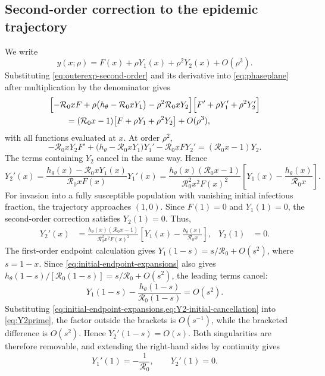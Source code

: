 \documentclass[11pt]{article}
\newcommand{\Rzero}{\mathcal R_0}
\newcommand{\rhoeps}{\rho}
\newcommand{\hth}{h_\theta}
\begin{document}
\subsection{Second-order correction to the epidemic trajectory}
We write
\begin{equation}
y(x;\rhoeps)=F(x)+\rhoeps Y_1(x)+\rhoeps^2Y_2(x)+O(\rhoeps^3).
\label{eq:outerexp-second-order}
\end{equation}
Substituting \cref{eq:outerexp-second-order} and its derivative into \cref{eq:phaseplane} after multiplication by the denominator gives
\[
\begin{aligned}
&\Bigl[-\Rzero xF+\rhoeps\bigl(\hth-\Rzero xY_1\bigr)
-\rhoeps^2\Rzero xY_2\Bigr]
\Bigl[F'+\rhoeps Y_1'+\rhoeps^2Y_2'\Bigr]\\
&\qquad=(\Rzero x-1)\bigl[F+\rhoeps Y_1+\rhoeps^2Y_2\bigr]+O(\rhoeps^3),
\end{aligned}
\]
with all functions evaluated at \(x\).
At order \(\rhoeps^2\),
\[
-\Rzero xY_2F'+\bigl(\hth-\Rzero xY_1\bigr)Y_1'
-\Rzero xF Y_2'=(\Rzero x-1)Y_2.
\]
The terms containing \(Y_2\) cancel in the same way. Hence
\[
Y_2'(x)=\frac{\hth(x)-\Rzero xY_1(x)}{\Rzero xF(x)}Y_1'(x)
=\frac{\hth(x)(\Rzero x-1)}{\Rzero^2x^2F(x)^2}
\left[Y_1(x)-\frac{\hth(x)}{\Rzero x}\right].
\]
For invasion into a fully susceptible population with vanishing initial infectious fraction, the trajectory approaches \((1,0)\). Since \(F(1)=0\) and \(Y_1(1)=0\), the second-order correction satisfies \(Y_2(1)=0\). Thus,
\begin{align}
Y_2'(x)&=\frac{\hth(x)(\Rzero x-1)}{\Rzero^2x^2F(x)^2}
\left[Y_1(x)-\frac{\hth(x)}{\Rzero x}\right],
&Y_2(1)&=0.
\label{eq:Y2prime}
\end{align}
The first-order endpoint calculation gives \(Y_1(1-s)=s/\Rzero+O(s^2)\), where \(s=1-x\).
Since \cref{eq:initial-endpoint-expansions} also gives \(\hth(1-s)/[\Rzero(1-s)]=s/\Rzero+O(s^2)\), the leading terms cancel:
\begin{equation}
Y_1(1-s)-\frac{\hth(1-s)}{\Rzero(1-s)}=O(s^2).
\label{eq:Y2-initial-cancellation}
\end{equation}
Substituting \cref{eq:initial-endpoint-expansions,eq:Y2-initial-cancellation} into \cref{eq:Y2prime}, the factor outside the brackets is \(O(s^{-1})\), while the bracketed difference is \(O(s^2)\). Hence \(Y_2'(1-s)=O(s)\). Both singularities are therefore removable, and extending the right-hand sides by continuity gives
\begin{equation}
Y_1'(1)=-\frac1{\Rzero},\qquad Y_2'(1)=0.
\label{eq:correction-endpoint-values}
\end{equation}
\end{document}
